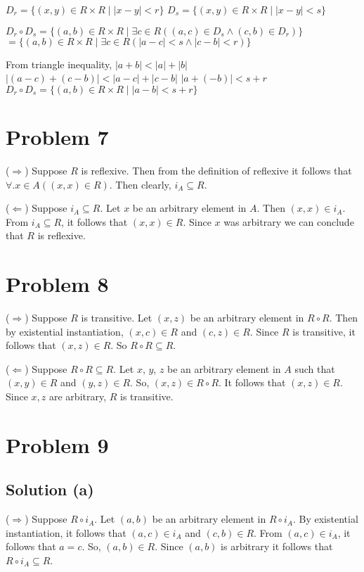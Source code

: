 \documentclass{article}
\begin{document}
$ D_r = \{(x,y) \in R \times R \mid |x - y| < r \}$
$ D_s = \{(x,y) \in R \times R \mid |x - y| < s \}$

$ D_r \circ D_s = \{(a,b) \in R \times R \mid \exists c \in R((a,c)
\in D_s \land (c,b) \in D_r)\}$
$= \{(a,b) \in R \times R \mid \exists c \in R (|a - c| < s \land |c -
b| < r)\}$

From triangle inequality, $|a + b| < |a| + |b|$
$|(a-c) + (c-b)| < |a-c| + |c-b|$
$|a + (-b)| < s + r$
$ D_r \circ D_s = \{(a,b) \in R \times R \mid |a-b| < s + r\}$

\section{Problem 7}

($\Rightarrow$) Suppose $R$ is reflexive. Then from the definition of
reflexive it follows that $\forall. x \in A((x,x) \in R)$. Then
clearly, $i_A \subseteq R$.

($\Leftarrow$) Suppose $i_A \subseteq R$. Let $x$ be an arbitrary
element in $A$. Then $(x,x) \in i_A$. From $i_A \subseteq R$, it
follows that $(x,x) \in R$. Since $x$ was arbitrary we can conclude
that $R$ is reflexive.

\section{Problem 8}

($\Rightarrow$) Suppose $R$ is transitive. Let $(x,z)$ be an arbitrary
element in $R \circ R$. Then by existential instantiation, $(x,c) \in
R$ and $(c,z) \in R$. Since $R$ is transitive, it follows that $(x,z)
\in R$. So $R \circ R \subseteq R$.

($\Leftarrow$) Suppose $R \circ R \subseteq R$. Let $x$, $y$, $z$ be
an arbitrary element in $A$ such that $(x,y) \in R$ and $(y,z) \in R$.
So, $(x,z) \in R \circ R$. It follows that $(x,z) \in R$. Since $x,z$
are arbitrary, $R$ is transitive.

\section{Problem 9}

\subsection{Solution (a)}

($\Rightarrow$) Suppose $R \circ i_A$. Let $(a,b)$ be an arbitrary
element in $R \circ i_A$. By existential instantiation, it follows
that $(a,c) \in i_A$ and $(c,b) \in R$. From $(a,c) \in i_A$, it
follows that $a = c$. So, $(a,b) \in R$. Since $(a,b)$ is arbitrary it
follows that $R \circ i_A \subseteq R$.
\end{document}
